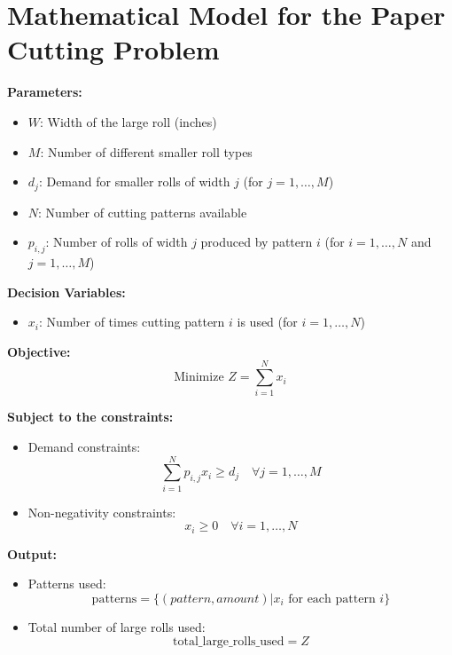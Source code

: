\documentclass{article}
\begin{document}
\section*{Mathematical Model for the Paper Cutting Problem}

\textbf{Parameters:}
\begin{itemize}
    \item $W$: Width of the large roll (inches)
    \item $M$: Number of different smaller roll types
    \item $d_j$: Demand for smaller rolls of width $j$ (for $j = 1, \ldots, M$)
    \item $N$: Number of cutting patterns available
    \item $p_{i,j}$: Number of rolls of width $j$ produced by pattern $i$ (for $i = 1, \ldots, N$ and $j = 1, \ldots, M$)
\end{itemize}

\textbf{Decision Variables:}
\begin{itemize}
    \item $x_i$: Number of times cutting pattern $i$ is used (for $i = 1, \ldots, N$)
\end{itemize}

\textbf{Objective:}
\[
\text{Minimize } Z = \sum_{i=1}^{N} x_i
\]

\textbf{Subject to the constraints:}
\begin{itemize}
    \item Demand constraints:
    \[
    \sum_{i=1}^{N} p_{i,j} x_i \geq d_j \quad \forall j = 1,\ldots,M
    \]
    \item Non-negativity constraints:
    \[
    x_i \geq 0 \quad \forall i = 1,\ldots,N
    \]
\end{itemize}

\textbf{Output:}
\begin{itemize}
    \item Patterns used:
    \[
    \text{patterns} = \{ (pattern, amount) | x_i \text{ for each pattern } i \} 
    \]
    \item Total number of large rolls used:
    \[
    \text{total\_large\_rolls\_used} = Z
    \]
\end{itemize}
\end{document}

